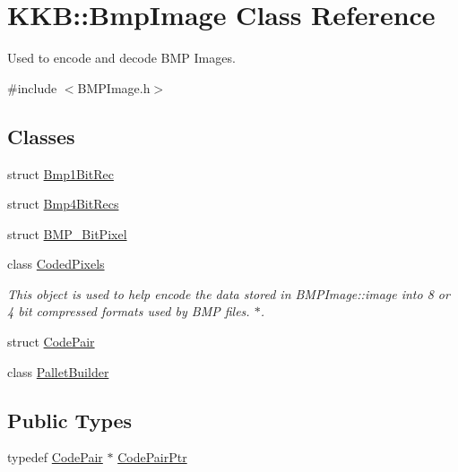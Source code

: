 \hypertarget{class_k_k_b_1_1_bmp_image}{}\section{K\+KB\+:\+:Bmp\+Image Class Reference}
\label{class_k_k_b_1_1_bmp_image}


Used to encode and decode B\+MP Images.  




{\ttfamily \#include $<$B\+M\+P\+Image.\+h$>$}

\subsection*{Classes}
\begin{DoxyCompactItemize}
\item 
struct \hyperlink{struct_bmp_image_1_1_bmp1_bit_rec}{Bmp1\+Bit\+Rec}
\item 
struct \hyperlink{struct_bmp_image_1_1_bmp4_bit_recs}{Bmp4\+Bit\+Recs}
\item 
struct \hyperlink{struct_bmp_image_1_1_b_m_p__24_bit_pixel}{B\+M\+P\+\_\+Bit\+Pixel}
\item 
class \hyperlink{class_bmp_image_1_1_coded_pixels}{Coded\+Pixels}
\begin{DoxyCompactList}\small\item\em This object is used to help encode the data stored in B\+M\+P\+Image\+::image into 8 or 4 bit compressed formats used by B\+MP files. $\ast$. \end{DoxyCompactList}\item 
struct \hyperlink{struct_bmp_image_1_1_code_pair}{Code\+Pair}
\item 
class \hyperlink{class_bmp_image_1_1_pallet_builder}{Pallet\+Builder}
\end{DoxyCompactItemize}
\subsection*{Public Types}
\begin{DoxyCompactItemize}
\item 
typedef \hyperlink{struct_bmp_image_1_1_code_pair}{Code\+Pair} $\ast$ \hyperlink{class_k_k_b_1_1_bmp_image_ac6ba8d374fb0f84c2953aa1b516da34c}{Code\+Pair\+Ptr}
\end{DoxyCompactItemize}

